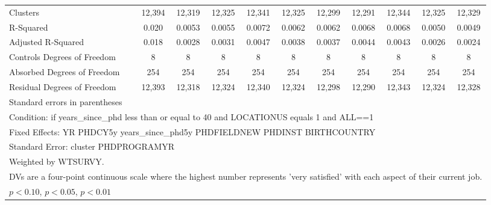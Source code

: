 \begin{table}[htbp]
\begin{tabular}{l*{10}{c}}
Clusters&      12,394         &      12,319         &      12,325         &      12,341         &      12,325         &      12,299         &      12,291         &      12,344         &      12,325         &      12,329         \\
R-Squared&       0.020         &      0.0053         &      0.0055         &      0.0072         &      0.0062         &      0.0062         &      0.0068         &      0.0068         &      0.0050         &      0.0049         \\
Adjusted R-Squared&       0.018         &      0.0028         &      0.0031         &      0.0047         &      0.0038         &      0.0037         &      0.0044         &      0.0043         &      0.0026         &      0.0024         \\
Controls Degrees of Freedom&           8         &           8         &           8         &           8         &           8         &           8         &           8         &           8         &           8         &           8         \\
Absorbed Degrees of Freedom&         254         &         254         &         254         &         254         &         254         &         254         &         254         &         254         &         254         &         254         \\
Residual Degrees of Freedom&      12,393         &      12,318         &      12,324         &      12,340         &      12,324         &      12,298         &      12,290         &      12,343         &      12,324         &      12,328         \\
\hline\hline
\multicolumn{11}{l}{\footnotesize Standard errors in parentheses}\\
\multicolumn{11}{l}{\footnotesize Condition: if years\_since\_phd less than or equal to 40 and LOCATIONUS equals 1 and ALL==1}\\
\multicolumn{11}{l}{\footnotesize Fixed Effects: YR PHDCY5y years\_since\_phd5y PHDFIELDNEW PHDINST BIRTHCOUNTRY}\\
\multicolumn{11}{l}{\footnotesize Standard Error: cluster PHDPROGRAMYR}\\
\multicolumn{11}{l}{\footnotesize Weighted by WTSURVY.}\\
\multicolumn{11}{l}{\footnotesize DVs are a four-point continuous scale where the highest number represents 'very satisfied' with each aspect of their current job.}\\
\multicolumn{11}{l}{\footnotesize \sym{*} \(p<0.10\), \sym{**} \(p<0.05\), \sym{***} \(p<0.01\)}\\
\end{tabular}
\end{table}
